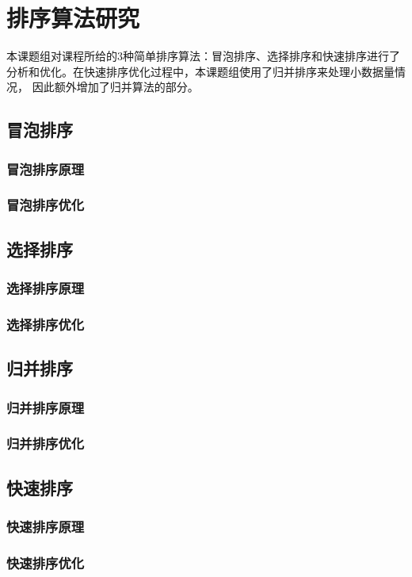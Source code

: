 \chapter{排序算法研究}
本课题组对课程所给的3种简单排序算法：冒泡排序、选择排序和快速排序进行了分析和优化。在快速排序优化过程中，本课题组使用了归并排序来处理小数据量情况，
因此额外增加了归并算法的部分。
\section{冒泡排序}
\subsection{冒泡排序原理}
\subsection{冒泡排序优化}

\section{选择排序}
\subsection{选择排序原理}
\subsection{选择排序优化}

\section{归并排序}
\subsection{归并排序原理}
\subsection{归并排序优化}

\section{快速排序}
\subsection{快速排序原理}
\subsection{快速排序优化}
